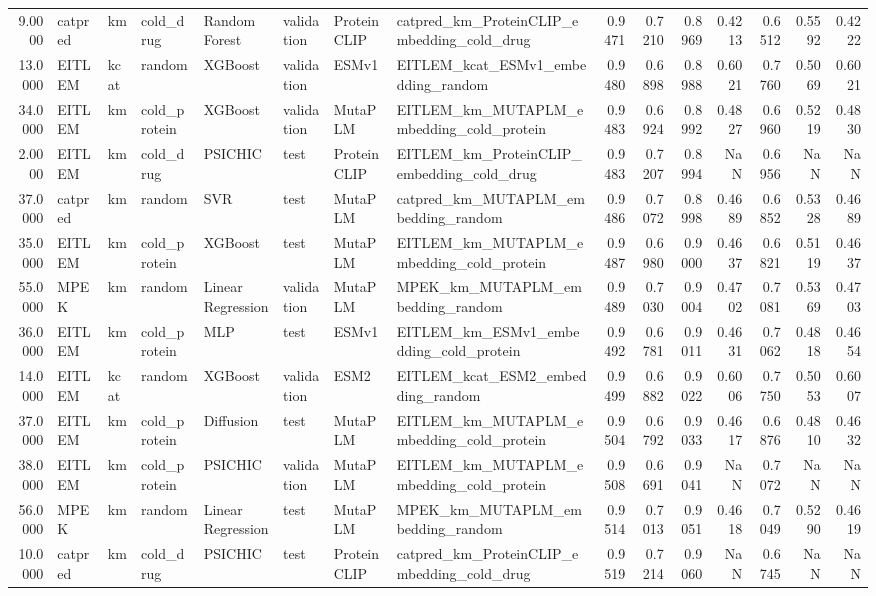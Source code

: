 \begin{tabular}{rlllllllrrrrrrr}
9.0000 & catpred & km & cold_drug & Random Forest & validation & ProteinCLIP & catpred_km_ProteinCLIP_embedding_cold_drug & 0.9471 & 0.7210 & 0.8969 & 0.4213 & 0.6512 & 0.5592 & 0.4222 \\
13.0000 & EITLEM & kcat & random & XGBoost & validation & ESMv1 & EITLEM_kcat_ESMv1_embedding_random & 0.9480 & 0.6898 & 0.8988 & 0.6021 & 0.7760 & 0.5069 & 0.6021 \\
34.0000 & EITLEM & km & cold_protein & XGBoost & validation & MutaPLM & EITLEM_km_MUTAPLM_embedding_cold_protein & 0.9483 & 0.6924 & 0.8992 & 0.4827 & 0.6960 & 0.5219 & 0.4830 \\
2.0000 & EITLEM & km & cold_drug & PSICHIC & test & ProteinCLIP & EITLEM_km_ProteinCLIP_embedding_cold_drug & 0.9483 & 0.7207 & 0.8994 & NaN & 0.6956 & NaN & NaN \\
37.0000 & catpred & km & random & SVR & test & MutaPLM & catpred_km_MUTAPLM_embedding_random & 0.9486 & 0.7072 & 0.8998 & 0.4689 & 0.6852 & 0.5328 & 0.4689 \\
35.0000 & EITLEM & km & cold_protein & XGBoost & test & MutaPLM & EITLEM_km_MUTAPLM_embedding_cold_protein & 0.9487 & 0.6980 & 0.9000 & 0.4637 & 0.6821 & 0.5119 & 0.4637 \\
55.0000 & MPEK & km & random & Linear Regression & validation & MutaPLM & MPEK_km_MUTAPLM_embedding_random & 0.9489 & 0.7030 & 0.9004 & 0.4702 & 0.7081 & 0.5369 & 0.4703 \\
36.0000 & EITLEM & km & cold_protein & MLP & test & ESMv1 & EITLEM_km_ESMv1_embedding_cold_protein & 0.9492 & 0.6781 & 0.9011 & 0.4631 & 0.7062 & 0.4818 & 0.4654 \\
14.0000 & EITLEM & kcat & random & XGBoost & validation & ESM2 & EITLEM_kcat_ESM2_embedding_random & 0.9499 & 0.6882 & 0.9022 & 0.6006 & 0.7750 & 0.5053 & 0.6007 \\
37.0000 & EITLEM & km & cold_protein & Diffusion & test & MutaPLM & EITLEM_km_MUTAPLM_embedding_cold_protein & 0.9504 & 0.6792 & 0.9033 & 0.4617 & 0.6876 & 0.4810 & 0.4632 \\
38.0000 & EITLEM & km & cold_protein & PSICHIC & validation & MutaPLM & EITLEM_km_MUTAPLM_embedding_cold_protein & 0.9508 & 0.6691 & 0.9041 & NaN & 0.7072 & NaN & NaN \\
56.0000 & MPEK & km & random & Linear Regression & test & MutaPLM & MPEK_km_MUTAPLM_embedding_random & 0.9514 & 0.7013 & 0.9051 & 0.4618 & 0.7049 & 0.5290 & 0.4619 \\
10.0000 & catpred & km & cold_drug & PSICHIC & test & ProteinCLIP & catpred_km_ProteinCLIP_embedding_cold_drug & 0.9519 & 0.7214 & 0.9060 & NaN & 0.6745 & NaN & NaN \\

\end{tabular}
